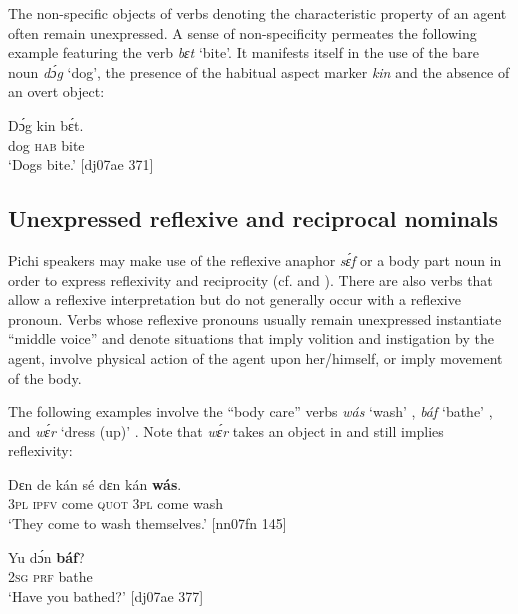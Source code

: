 The non-specific objects of verbs denoting the characteristic property of an agent often remain unexpressed. A sense of non-specificity permeates the following example featuring the verb \textit{bɛt} ‘bite’. It manifests itself in the use of the bare noun \textit{dɔ́g} ‘dog’, the presence of the habitual aspect marker \textit{kin} and the absence of an overt object:


\ea%
    \label{ex:key:1296}
    \gll Dɔ́g    kin  bɛ́t.\\
dog    \textsc{hab}  bite\\

\glt ‘Dogs bite.’ [dj07ae 371]
\z

\subsection{Unexpressed reflexive and reciprocal nominals}\label{sec:9.4.3}

Pichi speakers may make use of the reflexive anaphor \textit{sɛ́f} or a body part{\fff} noun in order to express reflexivity and reciprocity (cf.  and ). There are also verbs that allow a reflexive interpretation but do not generally occur with a reflexive pronoun. Verbs whose reflexive pronouns usually remain unexpressed instantiate “middle voice” \citep{Kemmer1993} and denote situations that imply volition and instigation by the agent, involve physical action of the agent upon her/himself, or imply movement of the body.


The following examples involve the “body care” verbs \textit{wás} ‘wash’ , \textit{báf} ‘bathe’ , and \textit{wɛ́r} ‘dress (up)’ . Note that \textit{wɛ́r} takes an object in  and still implies reflexivity:



\ea%
    \label{ex:key:1297}
    \gll Dɛn  de  kán    sé    dɛn  kán    \textbf{wás}.\\
\textsc{3pl}  \textsc{ipfv}  come  \textsc{quot}    \textsc{3pl}  come  wash\\

\glt ‘They come to wash themselves.’ [nn07fn 145]
\z


\ea%
    \label{ex:key:1298}
    \gll Yu  dɔ́n  \textbf{báf}?\\
\textsc{2sg}  \textsc{prf}  bathe\\

\glt ‘Have you bathed?’ [dj07ae 377]
\z


